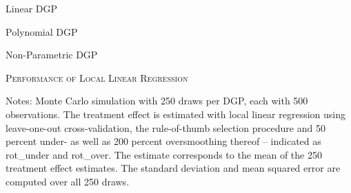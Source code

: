 \documentclass[11pt, a4paper, leqno]{article}
\numberwithin{equation}{section}
\numberwithin{figure}{section}
\numberwithin{table}{section}
\numberwithin{algorithm}{section}
\begin{document}
\begin{table}[H]
	\begin{subtable}{\textwidth}
		\centering
		
		\caption{Linear DGP}
		\label{tab: llr_linear}
		\hspace{\fill}
	\end{subtable}
	\begin{subtable}{\textwidth}
		\centering
		
		\caption{Polynomial DGP}
		\label{tab: llr_poly}
		\hspace{\fill}
	\end{subtable}
	\begin{subtable}{\textwidth}
		\centering
		
		\caption{Non-Parametric DGP}
		\label{tab: llr_nonparam}
	\end{subtable}
	\caption{\textsc{Performance of Local Linear Regression}}
	\label{tab: perf_nonpara}
	\medskip
	\justify
	\footnotesize{Notes: Monte Carlo simulation with 250 draws per DGP, each with 500 observations. The treatment effect is estimated with local linear regression using leave-one-out cross-validation, the rule-of-thumb selection procedure and 50 percent under- as well as 200 percent oversmoothing thereof -- indicated as rot\_under and rot\_over. The estimate corresponds to the mean of the 250 treatment effect estimates. The standard deviation and mean squared error are computed over all 250 draws.}
\end{table}
\end{document}

